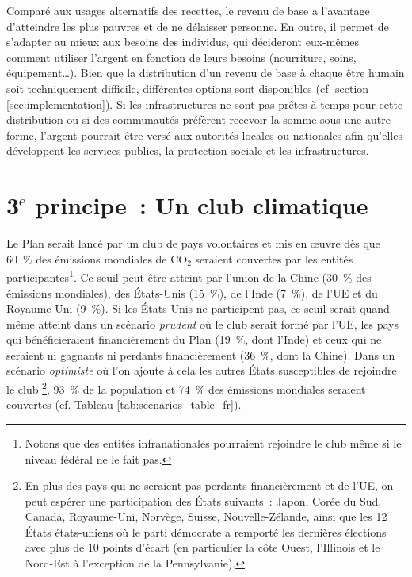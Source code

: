 \documentclass[a5paper,french,openany]{memoir}
\begin{document}
Comparé aux usages alternatifs des recettes, le revenu de base a l'avantage d'atteindre les plus pauvres et de ne délaisser personne. En outre, il permet de s'adapter au mieux aux besoins des individus, qui décideront eux-mêmes comment utiliser l'argent en fonction de leurs besoins (nourriture, soins, équipement\dots{}). 
Bien que la distribution d'un revenu de base à chaque être humain soit techniquement difficile, différentes options sont disponibles %
(cf. section \ref{sec:implementation}). Si les infrastructures ne sont pas prêtes à temps pour cette distribution ou si des communautés préfèrent recevoir la somme sous une autre forme, l'argent pourrait être versé aux autorités locales ou nationales afin qu'elles développent les services publics, la protection sociale et les infrastructures. 

\section{3$^\text{e}$ principe~: Un club climatique}

Le Plan serait lancé par un club de pays volontaires et mis en œuvre dès que 60~\% des émissions mondiales de CO$_\text{2}$ seraient couvertes par les entités participantes\footnote{Notons que des entités infranationales pourraient rejoindre le club même si le niveau fédéral ne le fait pas.}. Ce seuil peut être atteint par l'union de la Chine (30~\% des émissions mondiales), des États-Unis (15~\%), de l'Inde (7~\%), de l'UE et du Royaume-Uni (9~\%). Si les États-Unis ne participent pas, ce seuil serait quand même atteint dans un scénario \textit{prudent} où le club serait formé par l'UE, les pays qui bénéficieraient financièrement du Plan (19~\%, dont l'Inde) et ceux qui ne seraient ni gagnants ni perdants financièrement (36~\%, dont la Chine). %
Dans un scénario \textit{optimiste} où l'on ajoute à cela les autres États susceptibles de rejoindre le club
\footnote{En plus des pays qui ne seraient pas perdants financièrement et de l'UE, on peut espérer une participation des États suivants~: Japon, Corée du Sud, Canada, Royaume-Uni, Norvège, Suisse, Nouvelle-Zélande, ainsi que les 12 États états-uniens où le parti démocrate a remporté les dernières élections avec plus de 10 points d'écart (en particulier la côte Ouest, l'Illinois et le Nord-Est à l'exception de la Pennsylvanie).}, 
93~\% de la population et 74~\% des émissions mondiales seraient couvertes (cf. Tableau \ref{tab:scenarios_table_fr}). 
\end{document}
